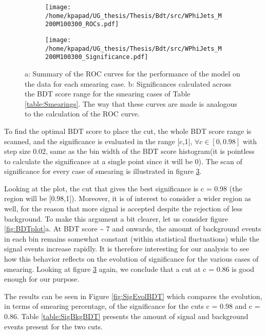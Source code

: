 \begin{figure}[h!]
\centering
\begin{subfigure}{0.49\textwidth}
\centering
\texttt{[image: /home/kpapad/UG\_thesis/Thesis/Bdt/src/WPhiJets\_M200M100300\_ROCs.pdf]}
\caption{}
\label{subfig:SmearingROC}
\end{subfigure}
\begin{subfigure}{0.49\textwidth}
\centering
\texttt{[image: /home/kpapad/UG\_thesis/Thesis/Bdt/src/WPhiJets\_M200M100300\_Significance.pdf]}
\caption{}
\label{subfig:SigScan}
\end{subfigure}
\caption{a: Summary of the ROC curves for the performance of the model on the data for each smearing case. b: Significances calculated across the BDT score range for the smearing cases of Table \ref{table:Smearings}. The way that these curves are made is analogous to the calculation of the ROC curve.}
\end{figure}

To find the optimal BDT score to place the cut, the whole BDT score range is scanned, and the significance is evaluated in the range [c,1], \(\forall c\in[0,0.98]\) with step size 0.02, same as the bin width of the BDT score histogram(it is pointless to calculate the significance at a single point since it will be 0). The scan of significance for every case of smearing is illustrated in figure \ref{subfig:SigScan}.

Looking at the plot, the cut that gives the best significance is c = 0.98 (the region will be [0.98,1]). Moreover, it is of interest to consider a wider region as well, for the reason that more signal is accepted despite the rejection of less background. To make this argument a bit clearer, let us consider figure \ref{fig:BDTplot}a. At BDT score \textasciitilde{} 7 and onwards, the amount of background events in each bin remains somewhat constant (within statistical fluctuations) while the signal events increase rapidly. It is therefore interesting for our analysis to see how this behavior reflects on the evolution of significance for the various cases of smearing. Looking at figure \ref{subfig:SigScan} again, we conclude that a cut at c = 0.86 is good enough for our purpose.

The results can be seen in Figure \ref{fig:SigEvolBDT} which compares the evolution, in terms of smearing percentage, of the significance for the cuts c = 0.98 and c = 0.86. Table \ref{table:SigBkgBDT} presents the amount of signal and background events present for the two cuts.


